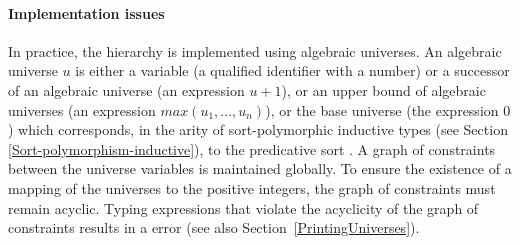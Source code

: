 \paragraph{Implementation issues}
In practice, the {\Type} hierarchy is implemented using algebraic
universes. An algebraic universe $u$ is either a variable (a qualified
identifier with a number) or a successor of an algebraic universe (an
expression $u+1$), or an upper bound of algebraic universes (an
expression $max(u_1,...,u_n)$), or the base universe (the expression
$0$) which corresponds, in the arity of sort-polymorphic inductive
types (see Section \ref{Sort-polymorphism-inductive}),
to the predicative sort {\Set}. A graph of constraints between
the universe variables is maintained globally. To ensure the existence
of a mapping of the universes to the positive integers, the graph of
constraints must remain acyclic.  Typing expressions that violate the
acyclicity of the graph of constraints results in a  error (see also Section~\ref{PrintingUniverses}).






